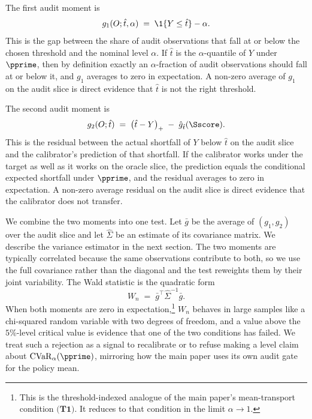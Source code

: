 \documentclass[11pt]{article}
\newcommand{\CVaR}{\mathrm{CVaR}}
\newcommand{\stoploss}[2]{\bigl(#1 - #2\bigr)_{+}}
\begin{document}
The first audit moment is
\begin{equation}\label{eq:g1}
g_1(O; \hat t, \alpha) \;=\; \1\{Y \le \hat t\} - \alpha.
\end{equation}
This is the gap between the share of audit observations that fall at or below the chosen threshold and the nominal level $\alpha$. If $\hat t$ is the $\alpha$-quantile of $Y$ under $\pprime$, then by definition exactly an $\alpha$-fraction of audit observations should fall at or below it, and $g_1$ averages to zero in expectation. A non-zero average of $g_1$ on the audit slice is direct evidence that $\hat t$ is not the right threshold.

The second audit moment is
\begin{equation}\label{eq:g2}
g_2(O; \hat t) \;=\; \stoploss{\hat t}{Y} \;-\; \hat g_{\hat t}(\Sscore).
\end{equation}
This is the residual between the actual shortfall of $Y$ below $\hat t$ on the audit slice and the calibrator's prediction of that shortfall. If the calibrator works under the target as well as it works on the oracle slice, the prediction equals the conditional expected shortfall under $\pprime$, and the residual averages to zero in expectation. A non-zero average residual on the audit slice is direct evidence that the calibrator does not transfer.

We combine the two moments into one test. Let $\bar g$ be the average of $(g_1, g_2)$ over the audit slice and let $\hat\Sigma$ be an estimate of its covariance matrix. We describe the variance estimator in the next section. The two moments are typically correlated because the same observations contribute to both, so we use the full covariance rather than the diagonal and the test reweights them by their joint variability. The Wald statistic is the quadratic form
\begin{equation}\label{eq:wald}
W_n \;=\; \bar g^{\top} \hat\Sigma^{-1} \bar g.
\end{equation}
When both moments are zero in expectation,\footnote{This is the threshold-indexed analogue of the main paper's mean-transport condition $\textbf{(T1)}$. It reduces to that condition in the limit $\alpha \to 1$.} $W_n$ behaves in large samples like a chi-squared random variable with two degrees of freedom, and a value above the $5\%$-level critical value is evidence that one of the two conditions has failed. We treat such a rejection as a signal to recalibrate or to refuse making a level claim about $\CVaR_\alpha(\pprime)$, mirroring how the main paper uses its own audit gate for the policy mean.
\end{document}
